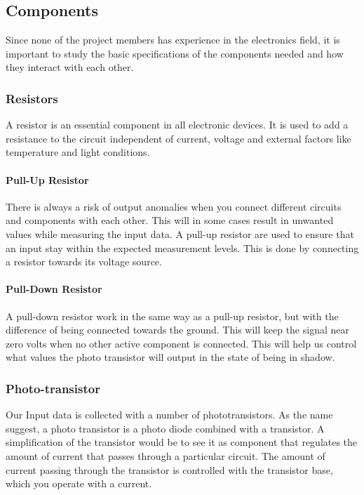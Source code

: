 \subsection{Components}
Since none of the project members has experience in the electronics field, it is 
important to study the basic specifications of the components needed and how they interact 
with each other. 

\subsubsection{Resistors}
A resistor is an essential component in all electronic devices. It is used to add a 
resistance to the circuit independent of current, voltage and external factors like 
temperature and light conditions.

\paragraph{Pull-Up Resistor}
There is always a risk of output anomalies when you connect different circuits and 
components with each other. This will in some cases result in unwanted values while 
measuring the input data.  A pull-up resistor are used to ensure that an input stay 
within the expected measurement levels. This is done by connecting a resistor towards 
its voltage source.

\paragraph{Pull-Down Resistor}
A pull-down resistor work in the same way as a pull-up resistor, but with the 
difference of being  connected towards the ground. This will keep the signal near zero 
volts when no other active component is connected. This will help us control what 
values the photo transistor will output in the state of being in shadow.

\subsubsection{Photo-transistor}
Our Input data is collected with a number of phototransistors. As the name 
suggest, a photo transistor is a photo diode combined with a transistor.  A 
simplification of the transistor would  be to see it as component that regulates 
the amount of current that passes through a particular circuit. The amount of current 
passing through the transistor is controlled with the transistor base, which you operate
with a current. 

